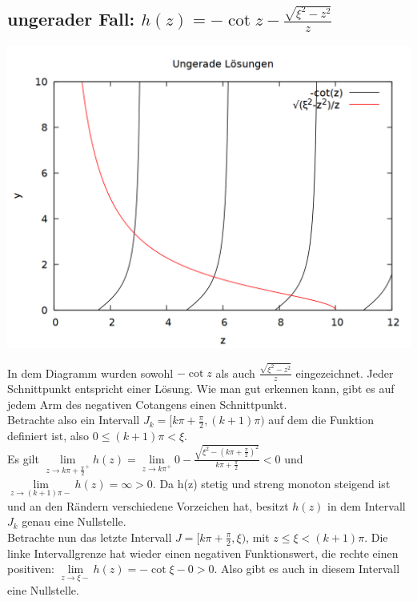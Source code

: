 \documentclass{scrartcl}
\begin{document}
\subsection*{ungerader Fall: $h(z) = -\cot z - \frac{\sqrt{\xi^2-z^2}}{z}$}

\begin{center}
\includegraphics[scale=0.3]{plot_cot.png}
\end{center}

In dem Diagramm wurden sowohl $-\cot z$ als auch $\frac{\sqrt{\xi^2-z^2}}{z}$ eingezeichnet. Jeder Schnittpunkt entspricht einer Lösung. Wie man gut erkennen kann, gibt es auf jedem Arm des negativen Cotangens einen Schnittpunkt.\\

Betrachte also ein Intervall $J_k = [k\pi+\frac{\pi}{2},(k+1)\pi)$ auf dem die Funktion definiert ist, also $0 \leq (k+1)\pi < \xi$.\\
Es gilt $\lim\limits_{z\to k\pi+\frac{\pi}{2}^+}{h(z)} = \lim\limits_{z\to k\pi^+}{0 - \frac{\sqrt{\xi^2-(k\pi+\frac{\pi}{2})^2}}{k\pi+\frac{\pi}{2}}} < 0$ und $\lim\limits_{z\to (k+1)\pi-}{h(z)} = \infty > 0$. Da h(z) stetig und streng monoton steigend ist und an den Rändern verschiedene Vorzeichen hat, besitzt $h(z)$ in dem Intervall $J_k$ genau eine Nullstelle.\\

Betrachte nun das letzte Intervall $J = [k\pi+\frac{\pi}{2}, \xi)$, mit $z \leq \xi < (k+1)\pi$. Die linke Intervallgrenze hat wieder einen negativen Funktionswert, die rechte einen positiven: $\lim\limits_{z\to \xi-}{h(z)} = -\cot{\xi} - 0 > 0$.  Also gibt es auch in diesem Intervall eine Nullstelle.\\
\end{document}
